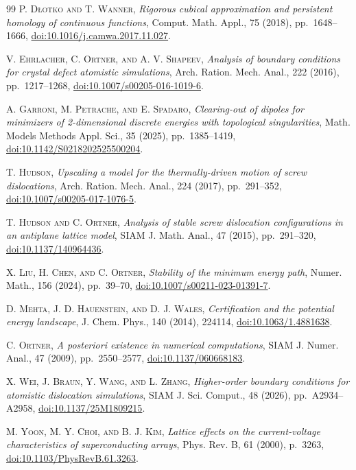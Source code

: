 \begin{thebibliography}{99}
\textsc{P. D\l{}otko and T. Wanner},
\emph{Rigorous cubical approximation and persistent homology of continuous functions}, Comput. Math. Appl., 75 (2018), pp.~1648--1666,
\href{https://doi.org/10.1016/j.camwa.2017.11.027}{doi:10.1016/j.camwa.2017.11.027}.

\textsc{V. Ehrlacher, C. Ortner, and A. V. Shapeev},
\emph{Analysis of boundary conditions for crystal defect atomistic simulations}, Arch. Ration. Mech. Anal., 222 (2016), pp.~1217--1268,
\href{https://doi.org/10.1007/s00205-016-1019-6}{doi:10.1007/s00205-016-1019-6}.

\textsc{A. Garroni, M. Petrache, and E. Spadaro},
\emph{Clearing-out of dipoles for minimizers of 2-dimensional discrete energies with topological singularities}, Math. Models Methods Appl. Sci., 35 (2025), pp.~1385--1419,
\href{https://doi.org/10.1142/S0218202525500204}{doi:10.1142/S0218202525500204}.

\textsc{T. Hudson},
\emph{Upscaling a model for the thermally-driven motion of screw dislocations}, Arch. Ration. Mech. Anal., 224 (2017), pp.~291--352,
\href{https://doi.org/10.1007/s00205-017-1076-5}{doi:10.1007/s00205-017-1076-5}.

\textsc{T. Hudson and C. Ortner},
\emph{Analysis of stable screw dislocation configurations in an antiplane lattice model}, SIAM J. Math. Anal., 47 (2015), pp.~291--320,
\href{https://doi.org/10.1137/140964436}{doi:10.1137/140964436}.

\textsc{X. Liu, H. Chen, and C. Ortner},
\emph{Stability of the minimum energy path}, Numer. Math., 156 (2024), pp.~39--70,
\href{https://doi.org/10.1007/s00211-023-01391-7}{doi:10.1007/s00211-023-01391-7}.

\textsc{D. Mehta, J. D. Hauenstein, and D. J. Wales},
\emph{Certification and the potential energy landscape}, J. Chem. Phys., 140 (2014), 224114,
\href{https://doi.org/10.1063/1.4881638}{doi:10.1063/1.4881638}.

\textsc{C. Ortner},
\emph{A posteriori existence in numerical computations}, SIAM J. Numer. Anal., 47 (2009), pp.~2550--2577,
\href{https://doi.org/10.1137/060668183}{doi:10.1137/060668183}.

\textsc{X. Wei, J. Braun, Y. Wang, and L. Zhang},
\emph{Higher-order boundary conditions for atomistic dislocation simulations}, SIAM J. Sci. Comput., 48 (2026), pp.~A2934--A2958,
\href{https://doi.org/10.1137/25M1809215}{doi:10.1137/25M1809215}.

\textsc{M. Yoon, M. Y. Choi, and B. J. Kim},
\emph{Lattice effects on the current-voltage characteristics of superconducting arrays}, Phys. Rev. B, 61 (2000), p.~3263,
\href{https://doi.org/10.1103/PhysRevB.61.3263}{doi:10.1103/PhysRevB.61.3263}.
\end{thebibliography}
